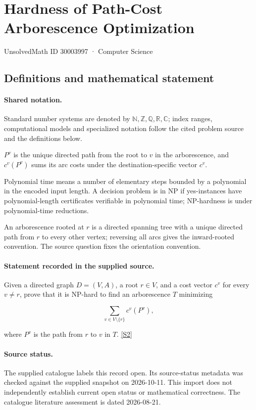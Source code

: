 \documentclass[11pt]{article}
\newcommand{\sref}[2]{\hyperlink{source:#1:#2}{[S#2]}}
\begin{document}
\setcounter{section}{30003996}
\section{Hardness of Path-Cost Arborescence Optimization}\label{30003997}
{\small\sffamily UnsolvedMath ID 30003997 · Computer Science}
\subsection{Definitions and mathematical statement}

\paragraph{Shared notation.}Standard number systems are denoted by $\mathbb N,\mathbb Z,\mathbb Q,\mathbb R,\mathbb C$; index ranges, computational models and specialized notation follow the cited problem source and the definitions below.


$P^v$ is the unique directed path from the root to $v$ in the arborescence, and $c^v(P^v)$ sums its arc costs under the destination-specific vector $c^v$.

Polynomial time means a number of elementary steps bounded by a polynomial in the encoded input length. A decision problem is in $\mathrm{NP}$ if yes-instances have polynomial-length certificates verifiable in polynomial time; NP-hardness is under polynomial-time reductions.

An arborescence rooted at $r$ is a directed spanning tree with a unique directed path from $r$ to every other vertex; reversing all arcs gives the inward-rooted convention. The source question fixes the orientation convention.
\paragraph{Statement recorded in the supplied source.}
Given a directed graph $D=(V,A)$, a root $r\in V$, and a cost vector $c^v$ for every $v\neq r$, prove that it is NP-hard to find an arborescence $T$ minimizing

$$\sum_{v\in V\setminus\{r\}}c^v(P^v),$$

where $P^v$ is the path from $r$ to $v$ in $T$. \sref{30003997}{2}
\paragraph{Source status.}
The supplied catalogue labels this record open. Its source-status metadata was checked against the supplied snapshot on 2026-10-11. This import does not independently establish current open status or mathematical correctness. The catalogue literature assessment is dated 2026-08-21.
\end{document}

